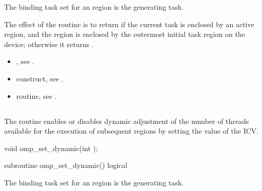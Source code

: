 \binding
The binding task set for an  region is the generating task.

\effect
The effect of the  routine is to return  if the current task is
enclosed by an active  region, and the  region is enclosed by the
outermost initial task region on the device; otherwise it returns .

\crossreferences
\begin{itemize}
\item {}, see
.

\item {} construct, see
.

\item {} routine, see
.
\end{itemize}








\bigskip
\subsection{}
\label{subsec:omp_set_dynamic}
\summary
The  routine enables or disables dynamic adjustment of the
number of threads available for the execution of subsequent  regions by
setting the value of the  ICV.


\format
\begin{ccppspecific}
\begin{ompcFunction}
void omp_set_dynamic(int );
\end{ompcFunction}
\end{ccppspecific}
\bigskip

\begin{samepage}
\begin{fortranspecific}
\begin{ompfSubroutine}
subroutine omp_set_dynamic()
logical 
\end{ompfSubroutine}
\end{fortranspecific}
\end{samepage}

\binding
The binding task set for an  region is the generating task.


